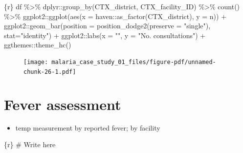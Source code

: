 \documentclass[
  letterpaper,
  DIV=11,
  numbers=noendperiod,
  oneside]{scrreprt}
\newenvironment{Shaded}{\begin{snugshade}}{\end{snugshade}}
\newcommand{\AttributeTok}[1]{\textcolor[rgb]{0.40,0.45,0.13}{#1}}
\newcommand{\CommentTok}[1]{\textcolor[rgb]{0.37,0.37,0.37}{#1}}
\newcommand{\FunctionTok}[1]{\textcolor[rgb]{0.28,0.35,0.67}{#1}}
\newcommand{\InformationTok}[1]{\textcolor[rgb]{0.37,0.37,0.37}{#1}}
\newcommand{\NormalTok}[1]{\textcolor[rgb]{0.00,0.23,0.31}{#1}}
\newcommand{\SpecialCharTok}[1]{\textcolor[rgb]{0.37,0.37,0.37}{#1}}
\newcommand{\StringTok}[1]{\textcolor[rgb]{0.13,0.47,0.30}{#1}}
\providecommand{\tightlist}{%
  \setlength{\itemsep}{0pt}\setlength{\parskip}{0pt}}\usepackage{longtable,booktabs,array}
\begin{document}
\begin{Shaded}
\begin{Highlighting}[]
\InformationTok{\textasciigrave{}\textasciigrave{}\textasciigrave{}\{r\}}
\NormalTok{df }\SpecialCharTok{\%\textgreater{}\%}
\NormalTok{  dplyr}\SpecialCharTok{::}\FunctionTok{group\_by}\NormalTok{(CTX\_district,}
\NormalTok{                  CTX\_facility\_ID) }\SpecialCharTok{\%\textgreater{}\%}
  \FunctionTok{count}\NormalTok{() }\SpecialCharTok{\%\textgreater{}\%} 
\NormalTok{  ggplot2}\SpecialCharTok{::}\FunctionTok{ggplot}\NormalTok{(}\FunctionTok{aes}\NormalTok{(}\AttributeTok{x =}\NormalTok{ haven}\SpecialCharTok{::}\FunctionTok{as\_factor}\NormalTok{(CTX\_district),}
                      \AttributeTok{y =}\NormalTok{ n)) }\SpecialCharTok{+} 
\NormalTok{  ggplot2}\SpecialCharTok{::}\FunctionTok{geom\_bar}\NormalTok{(}\AttributeTok{position =} \FunctionTok{position\_dodge2}\NormalTok{(}\AttributeTok{preserve =} \StringTok{"single"}\NormalTok{),}
                    \AttributeTok{stat=}\StringTok{"identity"}\NormalTok{) }\SpecialCharTok{+}
\NormalTok{  ggplot2}\SpecialCharTok{::}\FunctionTok{labs}\NormalTok{(}\AttributeTok{x =} \StringTok{""}\NormalTok{, }\AttributeTok{y =} \StringTok{"No. consultations"}\NormalTok{) }\SpecialCharTok{+}
\NormalTok{  ggthemes}\SpecialCharTok{::}\FunctionTok{theme\_hc}\NormalTok{()}
\InformationTok{\textasciigrave{}\textasciigrave{}\textasciigrave{}}
\end{Highlighting}
\end{Shaded}

\begin{figure}[H]

{\centering \texttt{[image: malaria\_case\_study\_01\_files/figure-pdf/unnamed-chunk-26-1.pdf]}

}

\end{figure}

\hypertarget{fever-assessment}{%
\section{Fever assessment}\label{fever-assessment}}

\begin{itemize}
\tightlist
\item
  temp measurement by reported fever; by facility
\end{itemize}

\begin{Shaded}
\begin{Highlighting}[]
\InformationTok{\textasciigrave{}\textasciigrave{}\textasciigrave{}\{r\}}
\CommentTok{\# Write here}
\InformationTok{\textasciigrave{}\textasciigrave{}\textasciigrave{}}
\end{Highlighting}
\end{Shaded}
\end{document}
